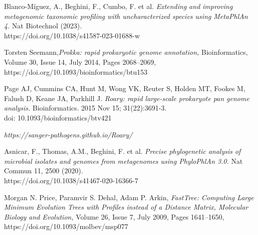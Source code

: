 \documentclass[a4paper,titlepage]{book}
\begin{document}
\begin{thebibliography}{}
Blanco-Míguez, A., Beghini, F., Cumbo, F. et al. \emph{Extending and improving metagenomic taxonomic profiling with uncharacterized species using MetaPhlAn 4.} Nat Biotechnol (2023). \\https://doi.org/10.1038/s41587-023-01688-w

Torsten Seemann,\emph{Prokka: rapid prokaryotic genome annotation,} Bioinformatics, Volume 30, Issue 14, July 2014, Pages 2068–2069,\\ https://doi.org/10.1093/bioinformatics/btu153

Page AJ, Cummins CA, Hunt M, Wong VK, Reuter S, Holden MT, Fookes M, Falush D, Keane JA, Parkhill J. \emph{Roary: rapid large-scale prokaryote pan genome analysis.} Bioinformatics. 2015 Nov 15; 31(22):3691-3. \\doi: 10.1093/bioinformatics/btv421

\emph{https://sanger-pathogens.github.io/Roary/}

Asnicar, F., Thomas, A.M., Beghini, F. et al.
\emph{Precise phylogenetic analysis of microbial isolates and genomes from metagenomes using PhyloPhlAn 3.0.} Nat Commun 11, 2500 (2020).\\ https://doi.org/10.1038/s41467-020-16366-7

Morgan N. Price, Paramvir S. Dehal, Adam P. Arkin, \emph{FastTree: Computing Large Minimum Evolution Trees with Profiles instead of a Distance Matrix, Molecular Biology and Evolution,} Volume 26, Issue 7, July 2009, Pages 1641–1650, \\https://doi.org/10.1093/molbev/msp077


\end{thebibliography}
\end{document}
